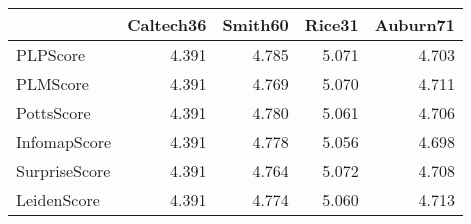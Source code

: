 \begin{tabular}{lrrrr}
\toprule
{} & Caltech36 & Smith60 & Rice31 & Auburn71 \\
\midrule
PLPScore      &     4.391 &   4.785 &  5.071 &    4.703 \\
PLMScore      &     4.391 &   4.769 &  5.070 &    4.711 \\
PottsScore    &     4.391 &   4.780 &  5.061 &    4.706 \\
InfomapScore  &     4.391 &   4.778 &  5.056 &    4.698 \\
SurpriseScore &     4.391 &   4.764 &  5.072 &    4.708 \\
LeidenScore   &     4.391 &   4.774 &  5.060 &    4.713 \\
\bottomrule
\end{tabular}
